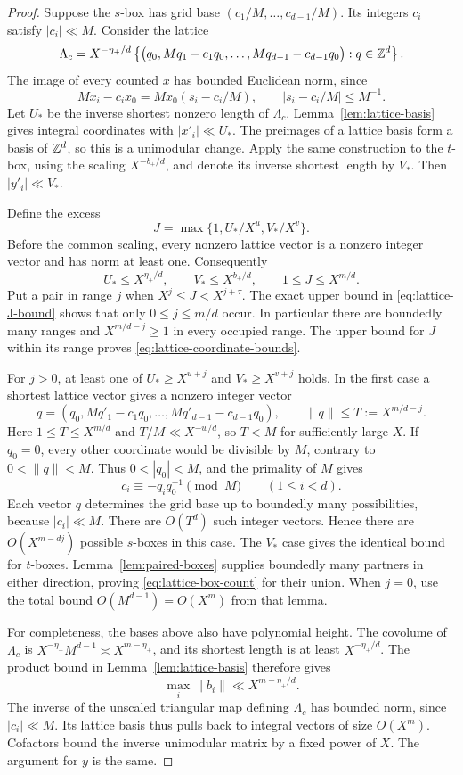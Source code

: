 \begin{proof}
Suppose the $s$-box has grid base $(c_1/M,\ldots,c_{d-1}/M)$.
Its integers $c_i$ satisfy $|c_i|\ll M$. Consider the lattice
\[
 \Lambda_c=X^{-\eta_+/d}
 \left\{\bigl(q_0,Mq_1-c_1q_0,\ldots,Mq_{d-1}-c_{d-1}q_0\bigr):
 q\in\mathbb Z^d\right\}.
\]
The image of every counted $x$ has bounded Euclidean norm, since
\[
 Mx_i-c_ix_0=Mx_0(s_i-c_i/M),\qquad |s_i-c_i/M|\le M^{-1}.
\]
Let $U_*$ be the inverse shortest nonzero length of $\Lambda_c$.
Lemma~\ref{lem:lattice-basis} gives integral coordinates with
$|x'_i|\ll U_*$. The preimages of a lattice basis form a basis of
$\mathbb Z^d$, so this is a unimodular change. Apply the same construction
to the $t$-box, using the scaling $X^{-b_+/d}$, and denote its
inverse shortest length by $V_*$. Then $|y'_i|\ll V_*$.

Define the excess
\[
 J=\max\{1,U_*/X^u,V_*/X^v\}.
\]
Before the common scaling, every nonzero lattice vector is a
nonzero integer vector and has norm at least one. Consequently
\begin{equation}\label{eq:lattice-J-bound}
 U_*\le X^{\eta_+/d},\qquad V_*\le X^{b_+/d},
 \qquad 1\le J\le X^{m/d}.
\end{equation}
Put a pair in range $j$ when $X^j\le J<X^{j+\tau}$.
The exact upper bound in \eqref{eq:lattice-J-bound} shows that
only $0\le j\le m/d$ occur. In particular there are boundedly
many ranges and $X^{m/d-j}\ge1$ in every occupied range.
The upper bound for $J$ within its range proves
\eqref{eq:lattice-coordinate-bounds}.

For $j>0$, at least one of $U_*\ge X^{u+j}$ and
$V_*\ge X^{v+j}$ holds. In the first case a shortest lattice
vector gives a nonzero integer vector
\[
 q=(q_0,Mq'_1-c_1q_0,\ldots,Mq'_{d-1}-c_{d-1}q_0),
 \qquad \|q\|\le T:=X^{m/d-j}.
\]
Here $1\le T\le X^{m/d}$ and $T/M\ll X^{-w/d}$, so $T<M$
for sufficiently large $X$. If $q_0=0$, every other coordinate
would be divisible by $M$, contrary to $0<\|q\|<M$.
Thus $0<|q_0|<M$, and the primality of $M$ gives
\[
 c_i\equiv-q_i q_0^{-1}\pmod M\qquad(1\le i<d).
\]
Each vector $q$ determines the grid base up to boundedly many
possibilities, because $|c_i|\ll M$. There are $O(T^d)$ such
integer vectors. Hence there are $O(X^{m-dj})$ possible $s$-boxes
in this case. The $V_*$ case gives the identical bound for
$t$-boxes. Lemma~\ref{lem:paired-boxes} supplies boundedly many
partners in either direction, proving \eqref{eq:lattice-box-count}
for their union. When $j=0$, use the total bound
$O(M^{d-1})=O(X^m)$ from that lemma.

For completeness, the bases above also have polynomial height.
The covolume of $\Lambda_c$ is
$X^{-\eta_+}M^{d-1}\asymp X^{m-\eta_+}$, and its shortest length
is at least $X^{-\eta_+/d}$. The product bound in
Lemma~\ref{lem:lattice-basis} therefore gives
\[
 \max_i\|b_i\|\ll X^{m-\eta_+/d}.
\]
The inverse of the unscaled triangular map defining $\Lambda_c$
has bounded norm, since $|c_i|\ll M$. Its lattice basis thus
pulls back to integral vectors of size $O(X^m)$. Cofactors bound
the inverse unimodular matrix by a fixed power of $X$.
The argument for $y$ is the same.
\end{proof}

